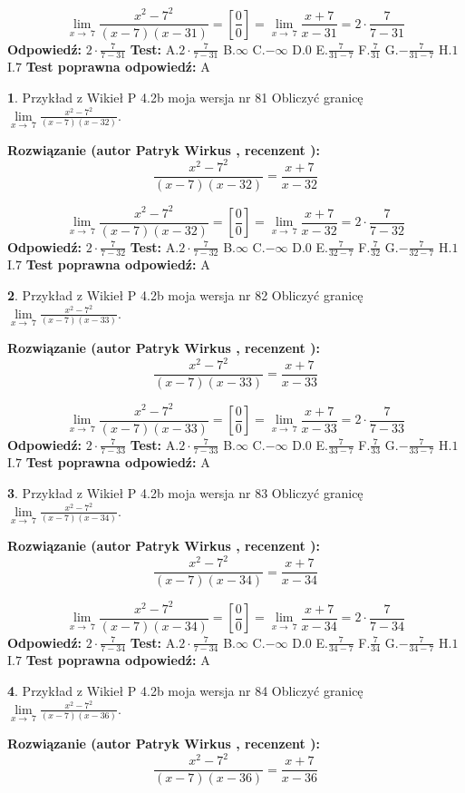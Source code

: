 \documentclass[12pt, a4paper]{article}
\theoremstyle{definition} %
\newtheorem{zad}{}
\newcommand{\zadStart}[1]{\begin{zad}#1\newline}
\newcommand{\zadStop}{\end{zad}}
\newcommand{\rozwStart}[2]{\noindent \textbf{Rozwiązanie (autor #1 , recenzent #2): }\newline}
\newcommand{\rozwStop}{\newline}
\newcommand{\odpStart}{\noindent \textbf{Odpowiedź:}\newline}
\newcommand{\odpStop}{\newline}
\newcommand{\testStart}{\noindent \textbf{Test:}\newline}
\newcommand{\testStop}{\newline}
\newcommand{\kluczStart}{\noindent \textbf{Test poprawna odpowiedź:}\newline}
\newcommand{\kluczStop}{\newline}
\begin{document}
$$\lim\limits_{x\to\ 7}\frac{x^{2}-7^{2}}{(x-7)(x-31)}=[\frac{0}{0}]=\lim\limits_{x\to\ 7}\frac{x+7}{x-31}=2 \cdot \frac{7}{7-31}$$
\rozwStop
\odpStart
$2 \cdot \frac{7}{7-31}$
\odpStop
\testStart
A.$2 \cdot \frac{7}{7-31}$
B.$\infty$
C.$-\infty$
D.$0$
E.$\frac{7}{31-7}$
F.$\frac{7}{31}$
G.$-\frac{7}{31-7}$
H.$1$
I.$7$
\testStop
\kluczStart
A
\kluczStop



\zadStart{Przykład z Wikieł P 4.2b moja wersja nr 81}
Obliczyć granicę $\lim\limits_{x\to\ 7}\frac{x^{2}-7^{2}}{(x-7)(x-32)}$.
\zadStop
\rozwStart{Patryk Wirkus}{}
$$\frac{x^{2}-7^{2}}{(x-7)(x-32)}=\frac{x+7}{x-32}$$

$$\lim\limits_{x\to\ 7}\frac{x^{2}-7^{2}}{(x-7)(x-32)}=[\frac{0}{0}]=\lim\limits_{x\to\ 7}\frac{x+7}{x-32}=2 \cdot \frac{7}{7-32}$$
\rozwStop
\odpStart
$2 \cdot \frac{7}{7-32}$
\odpStop
\testStart
A.$2 \cdot \frac{7}{7-32}$
B.$\infty$
C.$-\infty$
D.$0$
E.$\frac{7}{32-7}$
F.$\frac{7}{32}$
G.$-\frac{7}{32-7}$
H.$1$
I.$7$
\testStop
\kluczStart
A
\kluczStop



\zadStart{Przykład z Wikieł P 4.2b moja wersja nr 82}
Obliczyć granicę $\lim\limits_{x\to\ 7}\frac{x^{2}-7^{2}}{(x-7)(x-33)}$.
\zadStop
\rozwStart{Patryk Wirkus}{}
$$\frac{x^{2}-7^{2}}{(x-7)(x-33)}=\frac{x+7}{x-33}$$

$$\lim\limits_{x\to\ 7}\frac{x^{2}-7^{2}}{(x-7)(x-33)}=[\frac{0}{0}]=\lim\limits_{x\to\ 7}\frac{x+7}{x-33}=2 \cdot \frac{7}{7-33}$$
\rozwStop
\odpStart
$2 \cdot \frac{7}{7-33}$
\odpStop
\testStart
A.$2 \cdot \frac{7}{7-33}$
B.$\infty$
C.$-\infty$
D.$0$
E.$\frac{7}{33-7}$
F.$\frac{7}{33}$
G.$-\frac{7}{33-7}$
H.$1$
I.$7$
\testStop
\kluczStart
A
\kluczStop



\zadStart{Przykład z Wikieł P 4.2b moja wersja nr 83}
Obliczyć granicę $\lim\limits_{x\to\ 7}\frac{x^{2}-7^{2}}{(x-7)(x-34)}$.
\zadStop
\rozwStart{Patryk Wirkus}{}
$$\frac{x^{2}-7^{2}}{(x-7)(x-34)}=\frac{x+7}{x-34}$$

$$\lim\limits_{x\to\ 7}\frac{x^{2}-7^{2}}{(x-7)(x-34)}=[\frac{0}{0}]=\lim\limits_{x\to\ 7}\frac{x+7}{x-34}=2 \cdot \frac{7}{7-34}$$
\rozwStop
\odpStart
$2 \cdot \frac{7}{7-34}$
\odpStop
\testStart
A.$2 \cdot \frac{7}{7-34}$
B.$\infty$
C.$-\infty$
D.$0$
E.$\frac{7}{34-7}$
F.$\frac{7}{34}$
G.$-\frac{7}{34-7}$
H.$1$
I.$7$
\testStop
\kluczStart
A
\kluczStop



\zadStart{Przykład z Wikieł P 4.2b moja wersja nr 84}
Obliczyć granicę $\lim\limits_{x\to\ 7}\frac{x^{2}-7^{2}}{(x-7)(x-36)}$.
\zadStop
\rozwStart{Patryk Wirkus}{}
$$\frac{x^{2}-7^{2}}{(x-7)(x-36)}=\frac{x+7}{x-36}$$
\end{document}
